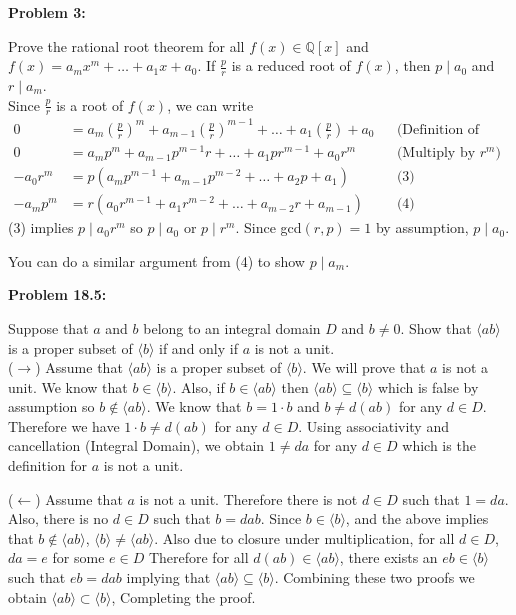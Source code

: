 \documentclass[letter paper, 12pt]{article}
\begin{document}
\noindent\textbf{Problem 3:}
    
    Prove the rational root theorem for all $f(x)\in\mathbb{Q}[x]$ and $f(x)=a_mx^m+\dots +a_1x + a_0$. If $\frac{p}{r}$ is a reduced root of $f(x)$, then $p\mid a_0$ and $r\mid a_m$. \\
    
    Since $\frac{p}{r}$ is a root of $f(x)$, we can write 
    \begin{align*}
        0 &= a_m\left(\frac{p}{r}\right)^m + a_{m-1}\left(\frac{p}{r}\right)^{m-1} + \dots + a_1\left(\frac{p}{r}\right) + a_0 &&\text{(Definition of root)}\\
        0 &= a_mp^m + a_{m-1}p^{m-1}r + \dots + a_1pr^{m-1} + a_0r^m &&\text{(Multiply by }r^m)\\
        -a_0r^m &= p(a_mp^{m-1} + a_{m-1}p^{m-2} + \dots + a_2p + a_1) &&\text{(3)}\\
        -a_mp^m &= r(a_0r^{m-1} + a_1r^{m-2} + \dots + a_{m-2}r + a_{m-1}) &&\text{(4)}
    \end{align*}
    (3) implies $p\mid a_0r^m$ so $p\mid a_0$ or $p\mid r^m$. Since gcd$(r,p)=1$ by assumption, $p\mid a_0$.
    
    \noindent You can do a similar argument from (4) to show $p\mid a_m$.
    
\noindent\textbf{Problem 18.5:}
    
    Suppose that $a$ and $b$ belong to an integral domain $D$ and $b\not = 0.$ Show that $\langle ab\rangle$ is a proper subset of $\langle b\rangle$ if and only if $a$ is not a unit.\\
    
    ($\rightarrow$) Assume that $\langle ab \rangle$ is a proper subset of $\langle b \rangle$. We will prove that $a$ is not a unit. We know that $b\in \langle b\rangle$. Also, if $b\in\langle ab \rangle$ then $\langle ab\rangle \subseteq\langle b\rangle$ which is false by assumption so $b\not\in\langle ab\rangle$. We know that $b=1\cdot b$ and $b\not=d(ab)$ for any $d\in D$. Therefore we have $1\cdot b \not= d(ab)$ for any $d\in D$. Using associativity and cancellation (Integral Domain), we obtain $1\not=da$ for any $d\in D$ which is the definition for $a$ is not a unit.
    
    ($\leftarrow$) Assume that $a$ is not a unit. Therefore there is not $d\in D$ such that $1=da$. Also, there is no $d\in D$ such that $b=dab$. Since $b\in\langle b\rangle$, and the above implies that $b\not\in\langle ab\rangle$, $\langle b\rangle \not=\langle ab\rangle$. Also due to closure under multiplication, for all $d\in D$, $da = e$ for some $e\in D$ Therefore for all $d(ab)\in\langle ab\rangle$, there exists an $eb\in\langle b\rangle$ such that $eb=dab$ implying that $\langle ab\rangle \subseteq \langle b\rangle$. Combining these two proofs we obtain $\langle ab\rangle \subset \langle b\rangle$, Completing the proof.
\end{document}

